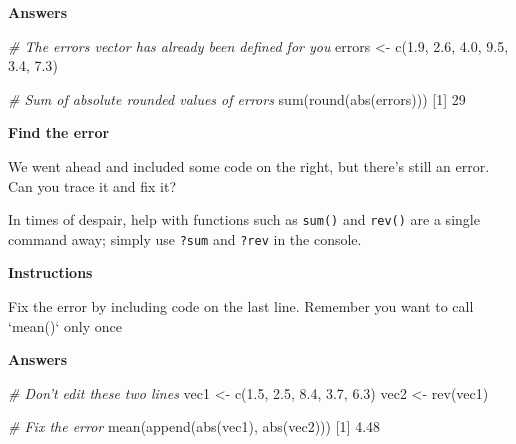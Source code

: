 \documentclass[]{article}
\newcommand{\hlnum}[1]{\textcolor[rgb]{0.816,0.125,0.439}{#1}}%
\newcommand{\hlstr}[1]{\textcolor[rgb]{0.251,0.627,0.251}{#1}}%
\newcommand{\hlcom}[1]{\textcolor[rgb]{0.502,0.502,0.502}{\textit{#1}}}%
\newcommand{\hlstd}[1]{\textcolor[rgb]{0.251,0.251,0.251}{#1}}%
\newcommand{\hlkwc}[1]{\textcolor[rgb]{0.251,0.251,0.251}{#1}}%
\newcommand{\hlkwd}[1]{\textcolor[rgb]{0.878,0.439,0.125}{#1}}%
\newenvironment{Shaded}{\begin{myshaded}}{\end{myshaded}}
\newcommand{\KeywordTok}[1]{\hlkwd{#1}}
\newcommand{\DataTypeTok}[1]{\hlkwc{#1}}
\newcommand{\DecValTok}[1]{\hlnum{#1}}
\newcommand{\FloatTok}[1]{\hlnum{#1}}
\newcommand{\StringTok}[1]{\hlstr{#1}}
\newcommand{\CommentTok}[1]{\hlcom{#1}}
\newcommand{\NormalTok}[1]{\hlstd{#1}}
\begin{document}
\textbf{Answers}

\begin{Shaded}
\begin{Highlighting}[]
\CommentTok{# The errors vector has already been defined for you}
\NormalTok{errors <-}\StringTok{ }\KeywordTok{c}\NormalTok{(}\FloatTok{1.9}\NormalTok{, }\OperatorTok{-}\FloatTok{2.6}\NormalTok{, }\FloatTok{4.0}\NormalTok{, }\OperatorTok{-}\FloatTok{9.5}\NormalTok{, }\OperatorTok{-}\FloatTok{3.4}\NormalTok{, }\FloatTok{7.3}\NormalTok{)}

\CommentTok{# Sum of absolute rounded values of errors}
\KeywordTok{sum}\NormalTok{(}\KeywordTok{round}\NormalTok{(}\KeywordTok{abs}\NormalTok{(errors)))}
\NormalTok{   [}\DecValTok{1}\NormalTok{] }\DecValTok{29}
\end{Highlighting}
\end{Shaded}

\textbf{Find the error}

We went ahead and included some code on the right, but there's still an
error. Can you trace it and fix it?

In times of despair, help with functions such as \texttt{sum()} and
\texttt{rev()} are a single command away; simply use \texttt{?sum} and
\texttt{?rev} in the console.

\textbf{Instructions}

\begin{Shaded}
\begin{Highlighting}[]
\NormalTok{Fix the error by including code on the last line. Remember}\OperatorTok{:}\StringTok{ }\NormalTok{you want to call }\StringTok{`}\DataTypeTok{mean()}\StringTok{`}\NormalTok{ only once}\OperatorTok{!}
\end{Highlighting}
\end{Shaded}

\textbf{Answers}

\begin{Shaded}
\begin{Highlighting}[]
\CommentTok{# Don't edit these two lines}
\NormalTok{vec1 <-}\StringTok{ }\KeywordTok{c}\NormalTok{(}\FloatTok{1.5}\NormalTok{, }\FloatTok{2.5}\NormalTok{, }\FloatTok{8.4}\NormalTok{, }\FloatTok{3.7}\NormalTok{, }\FloatTok{6.3}\NormalTok{)}
\NormalTok{vec2 <-}\StringTok{ }\KeywordTok{rev}\NormalTok{(vec1)}

\CommentTok{# Fix the error}
\KeywordTok{mean}\NormalTok{(}\KeywordTok{append}\NormalTok{(}\KeywordTok{abs}\NormalTok{(vec1), }\KeywordTok{abs}\NormalTok{(vec2)))}
\NormalTok{   [}\DecValTok{1}\NormalTok{] }\FloatTok{4.48}
\end{Highlighting}
\end{Shaded}
\end{document}
